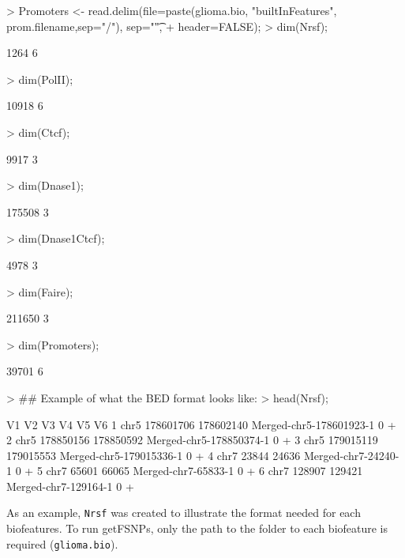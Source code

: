 \documentclass[12pt,fullpage]{article}
\newcommand{\Robject}[1]{{\texttt{#1}}}
\begin{document}
\begin{Schunk}
\begin{Sinput}
> Promoters <- read.delim(file=paste(glioma.bio, "builtInFeatures", prom.filename,sep="/"), sep="\t",
+ header=FALSE);
> dim(Nrsf);
\end{Sinput}
\begin{Soutput}
[1] 1264    6
\end{Soutput}
\begin{Sinput}
> dim(PolII);
\end{Sinput}
\begin{Soutput}
[1] 10918     6
\end{Soutput}
\begin{Sinput}
> dim(Ctcf);
\end{Sinput}
\begin{Soutput}
[1] 9917    3
\end{Soutput}
\begin{Sinput}
> dim(Dnase1);
\end{Sinput}
\begin{Soutput}
[1] 175508      3
\end{Soutput}
\begin{Sinput}
> dim(Dnase1Ctcf);
\end{Sinput}
\begin{Soutput}
[1] 4978    3
\end{Soutput}
\begin{Sinput}
> dim(Faire);
\end{Sinput}
\begin{Soutput}
[1] 211650      3
\end{Soutput}
\begin{Sinput}
> dim(Promoters);
\end{Sinput}
\begin{Soutput}
[1] 39701     6
\end{Soutput}
\begin{Sinput}
> ## Example of what the BED format looks like:
> head(Nrsf);
\end{Sinput}
\begin{Soutput}
    V1        V2        V3                      V4 V5 V6
1 chr5 178601706 178602140 Merged-chr5-178601923-1  0  +
2 chr5 178850156 178850592 Merged-chr5-178850374-1  0  +
3 chr5 179015119 179015553 Merged-chr5-179015336-1  0  +
4 chr7     23844     24636     Merged-chr7-24240-1  0  +
5 chr7     65601     66065     Merged-chr7-65833-1  0  +
6 chr7    128907    129421    Merged-chr7-129164-1  0  +
\end{Soutput}
\end{Schunk}

As an example, \Robject{Nrsf} was created to illustrate the format needed for
each biofeatures. To run getFSNPs, only the path to the folder to each
biofeature is required (\Robject{glioma.bio}).
\end{document}
